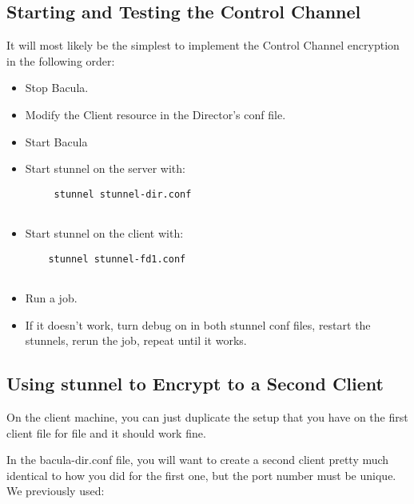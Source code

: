\subsection*{Starting and Testing the Control Channel}

It will most likely be the simplest to implement the Control Channel
encryption in the following order: 

\begin{itemize}
\item Stop Bacula.  
\item Modify the Client resource in the Director's conf  file.  
\item Start Bacula  
\item Start stunnel on the server with:  

   \footnotesize
\begin{verbatim}
     stunnel stunnel-dir.conf
  
\end{verbatim}
\normalsize

\item Start stunnel on the client with:  

   \footnotesize
\begin{verbatim}
    stunnel stunnel-fd1.conf
  
\end{verbatim}
\normalsize

\item Run a job.  
\item If it doesn't work, turn debug on in both stunnel conf files,  restart
   the stunnels, rerun the job, repeat until it works. 
   \end{itemize}

\subsection*{Using stunnel to Encrypt to a Second Client}

On the client machine, you can just duplicate the setup that you have on the
first client file for file and it should work fine. 

In the bacula-dir.conf file, you will want to create a second client pretty
much identical to how you did for the first one, but the port number must be
unique. We previously used: 

